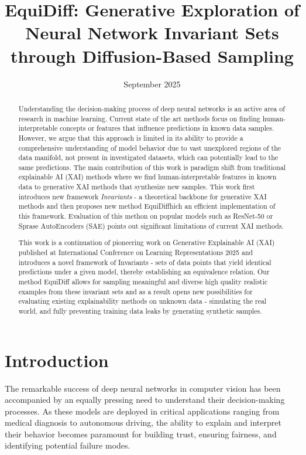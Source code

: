 \documentclass[licencjacka,en]{pracamgr}
\title{EquiDiff: Generative Exploration of Neural Network Invariant Sets through Diffusion-Based Sampling}
\date{September 2025}
\newcommand{\method}[1]{EquiDiff}  %
\newcommand{\framework}[1]{Invariants}  %
\begin{document}
\maketitle

\begin{abstract}
Understanding the decision-making process of deep neural networks is an active area of research in machine learning. Current state of the art methods focus on finding human-interpretable concepts or features that influence predictions in known data samples. However, we argue that this approach is limited in its ability to provide a comprehensive understanding of model behavior due to vast unexplored regions of the data manifold, not present in investigated datasets, which can potentially lead to the same predictions. The main contribution of this work is paradigm shift from traditional explainable AI (XAI) methods where we find human-interpretable features in known data to generative XAI methods that synthesize new samples. This work first introduces new framework \textit{\framework{}} - a theoretical backbone for generative XAI methods and then proposes new method \method which an efficient implementation of this framework. Evaluation of this methon on popular models such as ResNet-50 or Sprase AutoEncoders (SAE) points out significant limitations of current XAI methods.

This work is a continuation of pioneering work on Generative Explainable AI (XAI) \citep{sobieski2024rethinkingvisualcounterfactualexplanations} published at International Conference on Learning Representations 2025 and introduces a novel framework of \framework{} - sets of data points that yield identical predictions under a given model, thereby establishing an equivalence relation. Our method \method{} allows for sampling meaningful and diverse high quality realistic examples from these invariant sets and as a result opens new possibilities for  evaluating existing explainability methods on unknown data - simulating the real world, and fully preventing training data leaks by generating synthetic samples. 
\end{abstract}

\tableofcontents

\chapter{Introduction}\label{r:introduction}

The remarkable success of deep neural networks in computer vision has been accompanied by an equally pressing need to understand their decision-making processes. As these models are deployed in critical applications ranging from medical diagnosis to autonomous driving, the ability to explain and interpret their behavior becomes paramount for building trust, ensuring fairness, and identifying potential failure modes.
\end{document}
